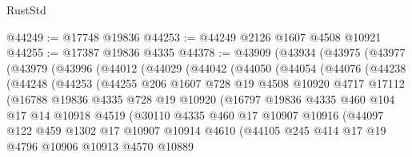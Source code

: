 \begin{lexlean}{RustStd}
\begin{coremodule}
{\begin{coremodule}
{{{{{{{{{{{{{{{{{{{{{{{{{{{{{{{{{{{{{{{{{{{{{{{{{{{{{{{@44249 := @17748 @19836
@44253 := @44249 @2126 @1607 @4508 @10921
@44255 := @17387 @19836 @4335
@44378 := @43909
    (@43934
      (@43975
        (@43977
          (@43979
            (@43996
              (@44012
                (@44029
                  (@44042
                    (@44050
                      (@44054
                        (@44076
                          (@44238
                            (@44248
                              (@44253
                                (@44255
                                  @206
                                  @1607
                                  @728
                                  @19
                                  @4508
                                  @10920
                                  @4717
                                  @17112
                                  (@16788
                                    @19836
                                    @4335
                                    @728
                                    @19
                                    @10920
                                    (@16797
                                      @19836
                                      @4335
                                      @460
                                      @104
                                      @17
                                      @14
                                      @10918
                                      @4519
                                      (@30110
                                        @4335
                                        @460
                                        @17
                                        @10907
                                        @10916
                                        (@44097
                                          @122
                                          @459
                                          @1302
                                          @17
                                          @10907
                                          @10914
                                          @4610
                                          (@44105
                                            @245
                                            @414
                                            @17
                                            @19
                                            @4796
                                            @10906
                                            @10913
                                            @4570
                                            @10889
}}}}}}}}}}}}}}}}}}}}}}}}}}}}}}}}}}}}}}}}}}}}}}}}}}}}}}}
\end{coremodule}}
\end{coremodule}
\end{lexlean}
